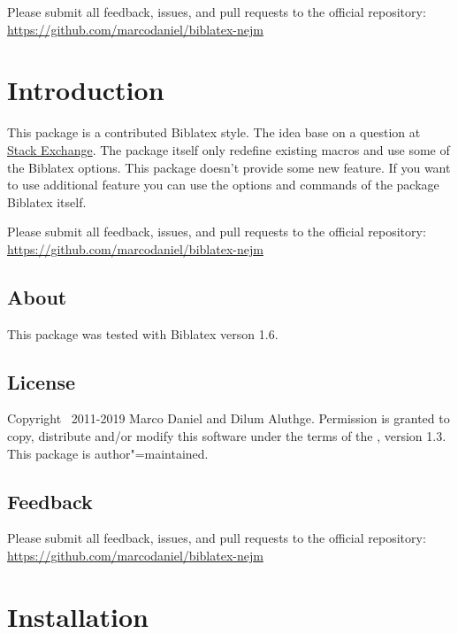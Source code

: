 \documentclass[english]{ltxdockit}[2011/03/25]
\newcommand*{\biblatex}{Biblatex\xspace}
\begin{document}
\printtitlepage

\vspace*{25px}

Please submit all feedback, issues, and pull requests to the official repository: \url{https://github.com/marcodaniel/biblatex-nejm}

\tableofcontents


\section{Introduction}
\label{int}

This package is a contributed \biblatex style. The idea base on a question at \href{http://tex.stackexchange.com/questions/26891/biblatex-style-file-for-new-england-journal-of-medicine-nejm/26894#26894}{Stack Exchange}. The package itself only redefine existing macros and use some of the \biblatex options. This package doesn't provide some new feature. If you want to use additional feature you can use the options and commands of the package \biblatex itself. 

Please submit all feedback, issues, and pull requests to the official repository: \url{https://github.com/marcodaniel/biblatex-nejm}

\subsection[About]{About }
\label{int:abt}

This package was tested with \biblatex verson 1.6.


\subsection{License}
Copyright \textcopyright\ 2011-2019 Marco Daniel and Dilum Aluthge. Permission is granted to copy, distribute and\slash or modify this software under the terms of the \lppl, version 1.3. This package is author"=maintained.

\subsection{Feedback}
\label{int:feb}

Please submit all feedback, issues, and pull requests to the official repository: \url{https://github.com/marcodaniel/biblatex-nejm}

\section{Installation}
\label{inst}
\end{document}
